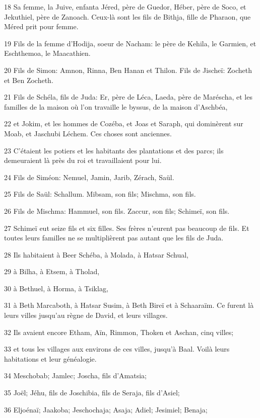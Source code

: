 \par 18 Sa femme, la Juive, enfanta Jéred, père de Guedor, Héber, père de Soco, et Jekuthiel, père de Zanoach. Ceux-là sont les fils de Bithja, fille de Pharaon, que Méred prit pour femme.
\par 19 Fils de la femme d'Hodija, soeur de Nacham: le père de Kehila, le Garmien, et Eschthemoa, le Maacathien.
\par 20 Fils de Simon: Amnon, Rinna, Ben Hanan et Thilon. Fils de Jischeï: Zocheth et Ben Zocheth.
\par 21 Fils de Schéla, fils de Juda: Er, père de Léca, Laeda, père de Maréscha, et les familles de la maison où l'on travaille le byssus, de la maison d'Aschbéa,
\par 22 et Jokim, et les hommes de Cozéba, et Joas et Saraph, qui dominèrent sur Moab, et Jaschubi Léchem. Ces choses sont anciennes.
\par 23 C'étaient les potiers et les habitants des plantations et des parcs; ils demeuraient là près du roi et travaillaient pour lui.
\par 24 Fils de Siméon: Nemuel, Jamin, Jarib, Zérach, Saül.
\par 25 Fils de Saül: Schallum. Mibsam, son fils; Mischma, son fils.
\par 26 Fils de Mischma: Hammuel, son fils. Zaccur, son fils; Schimeï, son fils.
\par 27 Schimeï eut seize fils et six filles. Ses frères n'eurent pas beaucoup de fils. Et toutes leurs familles ne se multiplièrent pas autant que les fils de Juda.
\par 28 Ils habitaient à Beer Schéba, à Molada, à Hatsar Schual,
\par 29 à Bilha, à Etsem, à Tholad,
\par 30 à Bethuel, à Horma, à Tsiklag,
\par 31 à Beth Marcaboth, à Hatsar Susim, à Beth Bireï et à Schaaraïm. Ce furent là leurs villes jusqu'au règne de David, et leurs villages.
\par 32 Ils avaient encore Etham, Aïn, Rimmon, Thoken et Aschan, cinq villes;
\par 33 et tous les villages aux environs de ces villes, jusqu'à Baal. Voilà leurs habitations et leur généalogie.
\par 34 Meschobab; Jamlec; Joscha, fils d'Amatsia;
\par 35 Joël; Jéhu, fils de Joschibia, fils de Seraja, fils d'Asiel;
\par 36 Eljoénaï; Jaakoba; Jeschochaja; Asaja; Adiel; Jesimiel; Benaja;
